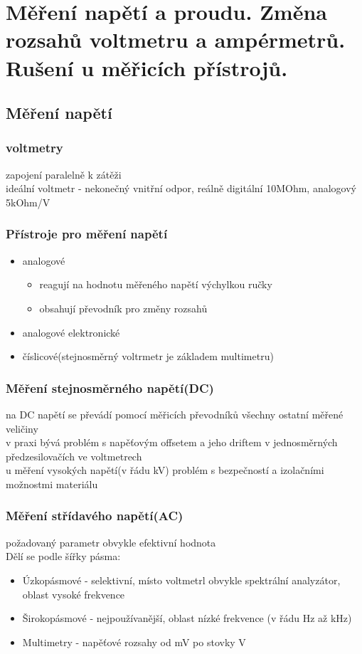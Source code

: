 \section{Měření napětí a proudu. Změna rozsahů voltmetru a ampérmetrů. Rušení u měřicích přístrojů.}

\subsection*{Měření napětí}
\subsubsection*{voltmetry}
zapojení paralelně k zátěži\\
ideální voltmetr - nekonečný vnitřní odpor, reálně digitální 10MOhm, analogový 5kOhm/V \\
\subsubsection*{Přístroje pro měření napětí}
\begin{itemize}
    \item analogové
          \begin{itemize}
              \item reagují na hodnotu měřeného napětí výchylkou ručky
              \item obsahují převodník pro změny rozsahů
          \end{itemize}
    \item analogové elektronické
    \item číslicové(stejnosměrný voltrmetr je základem multimetru)
\end{itemize}
\subsubsection*{Měření stejnosměrného napětí(DC)}
na DC napětí se převádí pomocí měřicích převodníků všechny ostatní měřené veličiny\\
v praxi bývá problém s napěťovým offsetem a jeho driftem v jednosměrných předzesilovačích ve voltmetrech\\
u měření vysokých napětí(v řádu kV) problém s bezpečností a izolačními možnostmi materiálu\\
\subsubsection*{Měření střídavého napětí(AC)}
požadovaný parametr obvykle efektivní hodnota\\
Dělí se podle šířky pásma:
\begin{itemize}
    \item Úzkopásmové - selektivní, místo voltmetrl obvykle spektrální analyzátor, oblast vysoké frekvence
    \item Širokopásmové - nejpoužívanější, oblast nízké frekvence (v řádu Hz až kHz)
    \item Multimetry - napěťové rozsahy od mV po stovky V
\end{itemize}
\newpage

